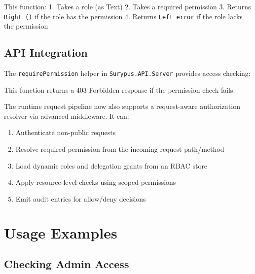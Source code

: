 This function: 1. Takes a role (as Text) 2. Takes a required permission
3. Returns \texttt{Right\ ()} if the role has the permission 4. Returns
\texttt{Left\ error} if the role lacks the permission

\subsection{API Integration}\label{api-integration}

The \texttt{requirePermission} helper in \texttt{Surypus.API.Server}
provides access checking:

\begin{Shaded}
\begin{Highlighting}[]
  \OtherTok{{-}\textgreater{}}  \OtherTok{{-}\textgreater{}} \NormalTok{ ()}
\end{Highlighting}
\end{Shaded}

This function returns a 403 Forbidden response if the permission check
fails.

The runtime request pipeline now also supports a request-aware
authorization resolver via advanced middleware. It can:

\begin{enumerate}
\def\labelenumi{\arabic{enumi}.}
\tightlist
\item
  Authenticate non-public requests
\item
  Resolve required permission from the incoming request path/method
\item
  Load dynamic roles and delegation grants from an RBAC store
\item
  Apply resource-level checks using scoped permissions
\item
  Emit audit entries for allow/deny decisions
\end{enumerate}

\section{Usage Examples}\label{usage-examples}

\subsection{Checking Admin Access}\label{checking-admin-access}

\begin{Shaded}
\begin{Highlighting}[]
  
  \NormalTok{ () }\OtherTok{{-}\textgreater{}} 
  \OtherTok{{-}\textgreater{}} 
\end{Highlighting}
\end{Shaded}

